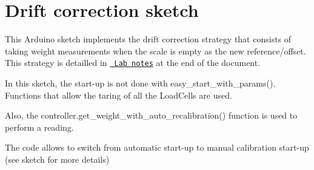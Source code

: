 \chapter{Drift correction sketch}
\hypertarget{md__sketch_examples_2_weight_reading_with_recalibration_mode_switching_2_r_e_a_d_m_e}{}\label{md__sketch_examples_2_weight_reading_with_recalibration_mode_switching_2_r_e_a_d_m_e}
\label{md__sketch_examples_2_weight_reading_with_recalibration_mode_switching_2_r_e_a_d_m_e_autotoc_md0}%
%
 This Arduino sketch implements the drift correction strategy that consists of taking weight measurements when the scale is empty as the new reference/offset. This strategy is detailled in \href{https://www.overleaf.com/read/vvxvjbdjmgmg}{\texttt{ Lab notes}} at the end of the document.

In this sketch, the start-\/up is not done with easy\+\_\+start\+\_\+with\+\_\+params(). Functions that allow the taring of all the Load\+Cells are used.

Also, the controller.\+get\+\_\+weight\+\_\+with\+\_\+auto\+\_\+recalibration() function is used to perform a reading.

The code allows to switch from automatic start-\/up to manual calibration start-\/up (see sketch for more details) 